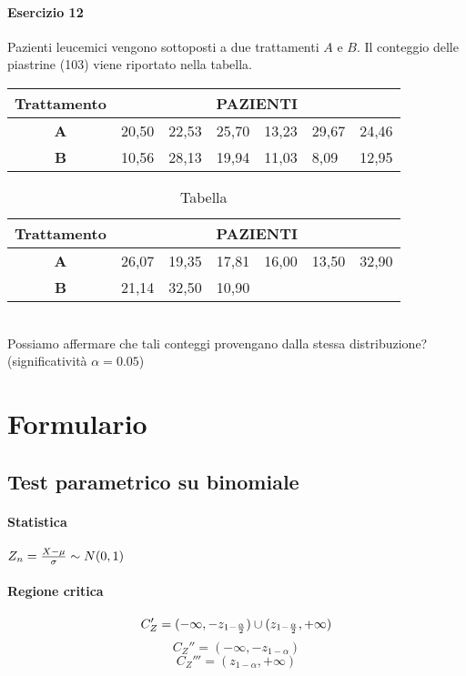 \documentclass[12pt]{article}
\begin{document}
    \paragraph{Esercizio 12}
    Pazienti leucemici vengono sottoposti a due trattamenti $A$ e $B$. Il conteggio delle piastrine (103) viene riportato nella tabella.
    \begin{table}[!htb]
        \centering
        \begin{tabular}{|c|l|l|l|l|l|l|}
        \hline
        Trattamento & \multicolumn{6}{c|}{\textbf{PAZIENTI}}        \\ \hline
        \textbf{A}  & 20,50 & 22,53 & 25,70 & 13,23 & 29,67 & 24,46 \\ \hline
        \textbf{B}  & 10,56 & 28,13 & 19,94 & 11,03 & 8,09  & 12,95 \\ \hline
        \end{tabular}
        \label{tab:my-table13}
    \end{table}
    \begin{table}[!htb]
        \centering
        \begin{tabular}{|c|l|l|l|l|l|l|}
        \hline
        Trattamento & \multicolumn{6}{c|}{\textbf{PAZIENTI}}        \\ \hline
        \textbf{A}  & 26,07 & 19,35 & 17,81 & 16,00 & 13,50 & 32,90 \\ \hline
        \textbf{B}  & 21,14 & 32,50 & 10,90 &       &       &       \\ \hline
        \end{tabular}
        \caption{Tabella}
        \label{tab:my-table14}
    \end{table}
    \\Possiamo affermare che tali conteggi provengano dalla stessa distribuzione? (significatività $\alpha=0.05$)

    \newpage
    \section{Formulario}
    \subsection{Test parametrico su binomiale}
    \paragraph{Statistica} $Z_n = {{X-\mu} \over \sigma} \sim N(0, 1) $
    \paragraph{Regione critica} 
    $$C_Z' = (-\infty, -z_{1-{\alpha \over 2}}) \cup (z_{1-{\alpha \over 2}}, +\infty)$$
    $$C_Z'' = (-\infty, -z_{1-\alpha})$$
    $$C_Z''' = (z_{1-\alpha}, +\infty)$$
\end{document}
